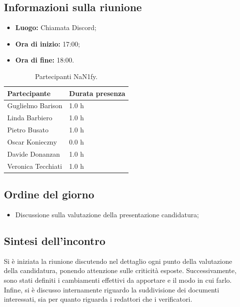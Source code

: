 \documentclass[8pt]{article}
\begin{document}
\subsection{Informazioni sulla riunione}
\begin{itemize}
	\setlength\itemsep{0em}
	\item\textbf{Luogo:} Chiamata Discord;
	\item\textbf{Ora di inizio:} 17:00;
	\item\textbf{Ora di fine:}  18:00.
\end{itemize}
\begin{table}[ht!]
	\begin{minipage}[t]{0.5\linewidth}
		\centering
		\begin{tabular}{p{3cm} p{3cm}}
			\toprule
			\textbf{Partecipante} & \textbf{Durata presenza} \\
			\midrule
			Guglielmo Barison & 1.0 h \\
			Linda Barbiero &  1.0 h \\
			Pietro Busato & 1.0 h \\
			Oscar Konieczny & 0.0 h \\
			Davide Donanzan & 1.0 h \\
			Veronica Tecchiati & 1.0 h \\
			\bottomrule
		\end{tabular}
		\caption{Partecipanti NaN1fy.}
		\label{table:Partecipanti NaN1fy}
	\end{minipage}
\end{table}
\subsection{Ordine del giorno}
\begin{itemize}
	\setlength\itemsep{0em}
	\item Discussione sulla valutazione della presentazione candidatura;
\end{itemize}
\subsection{Sintesi dell'incontro}
Si è iniziata la riunione discutendo nel dettaglio ogni punto della valutazione della candidatura, ponendo attenzione sulle criticità esposte. Successivamente, sono stati definiti i cambiamenti effettivi da apportare e il modo in cui farlo. Infine, si è discusso internamente riguardo la suddivisione dei documenti interessati, sia per quanto riguarda i redattori che i verificatori.
\end{document}
